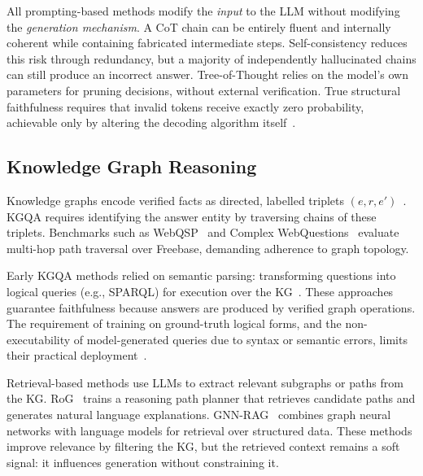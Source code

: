 All prompting-based methods modify the \textit{input} to the LLM without modifying the
\textit{generation mechanism}. A CoT chain can be entirely fluent and internally coherent
while containing fabricated intermediate steps. Self-consistency reduces this risk through
redundancy, but a majority of independently hallucinated chains can still produce an
incorrect answer. Tree-of-Thought relies on the model's own parameters for pruning
decisions, without external verification. True structural faithfulness requires that
invalid tokens receive exactly zero probability, achievable only by altering the decoding
algorithm itself~\citep{geng2023grammarconstrained, willard2023outlines}.

\subsection{Knowledge Graph Reasoning}
\label{sec:related:kg}

Knowledge graphs encode verified facts as directed, labelled triplets
$(e, r, e')$~\citep{bollacker2008freebase}. KGQA requires identifying the answer
entity by traversing chains of these triplets. Benchmarks such as
WebQSP~\citep{yih2016websqp} and Complex WebQuestions~\citep{talmor2018cwq} evaluate
multi-hop path traversal over Freebase, demanding adherence to graph topology.

Early KGQA methods relied on semantic parsing: transforming questions into logical
queries (e.g., SPARQL) for execution over the
KG~\citep{lan2022survey}. These approaches guarantee faithfulness because answers are
produced by verified graph operations. The requirement of training on ground-truth
logical forms, and the non-executability of model-generated queries due to syntax or
semantic errors, limits their practical deployment~\citep{lan2022survey}.

Retrieval-based methods use LLMs to extract relevant subgraphs or paths from the KG.
RoG~\citep{luo2024rog} trains a reasoning path planner that retrieves candidate paths
and generates natural language explanations. GNN-RAG~\citep{mavromatis2022rearev}
combines graph neural networks with language models for retrieval over structured data.
These methods improve relevance by filtering the KG, but the retrieved context remains
a soft signal: it influences generation without constraining it.

